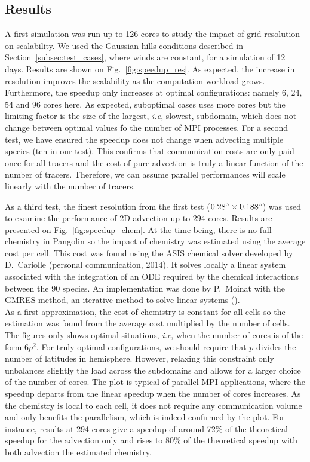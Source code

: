 \subsection{Results}
\label{subsec:results} 
A first simulation was run up to 126 cores to study the impact of grid
resolution on scalability. We used the Gaussian hills conditions described in
Section~\ref{subsec:test_cases}, where winds are constant, for a simulation of
12 days. Results are shown on Fig.~\ref{fig:speedup_res}. As expected, the
increase in resolution improves the scalability as the computation workload
grows. Furthermore, the speedup only increases at optimal configurations: namely
6, 24, 54 and 96 cores here. As expected, suboptimal cases uses more cores but
the limiting factor is the size of the largest, \textit{i.e}, slowest,
subdomain, which does not change between optimal values fo the number of MPI
processes.  For a second test, we have ensured the speedup does not change when
advecting multiple species (ten in our test). This confirms that communication
costs are only paid once for all tracers and the cost of pure advection is truly
a linear function of the number of tracers. Therefore, we can assume parallel
performances will scale linearly with the number of tracers.

As a third test, the finest resolution from the first test
($0.28{^{\circ}}\times0.188^{\circ}$) was used to examine the performance of 2D
advection up to 294 cores. Results are presented on Fig.~\ref{fig:speedup_chem}.
At the time being, there is no full chemistry in Pangolin so the impact of
chemistry was estimated using the average cost per cell. This cost was found
using the ASIS chemical solver developed by D.~Cariolle (personal communication,
2014). It solves locally a linear system associated with the integration of an
\gls{ODE} required by the chemical interactions between the 90 species. An
implementation was done by P.~Moinat with the GMRES method, an iterative method
to solve linear systems (\cite{Saad1986}). \\
As a first approximation, the cost of chemistry is constant for all cells so the
estimation was found from the average cost multiplied by the number of cells.
The figures only shows optimal situations, \textit{i.e}, when the number of
cores is of the form $6p^2$.  For truly optimal configurations, we should
require that $p$ divides the number of latitudes in hemisphere. However,
relaxing this constraint only unbalances slightly the load across the subdomains
and allows for a larger choice of the number of cores.  The plot is typical of
parallel MPI applications, where the speedup departs from the linear speedup
when the number of cores increases. As the chemistry is local to each cell, it does
not require any communication volume and only benefits the parallelism, which is
indeed confirmed by the plot. For instance, results at 294 cores give a speedup
of around 72\% of the theoretical speedup for the advection only and rises to
80\% of the theoretical speedup with both advection the estimated chemistry. 

